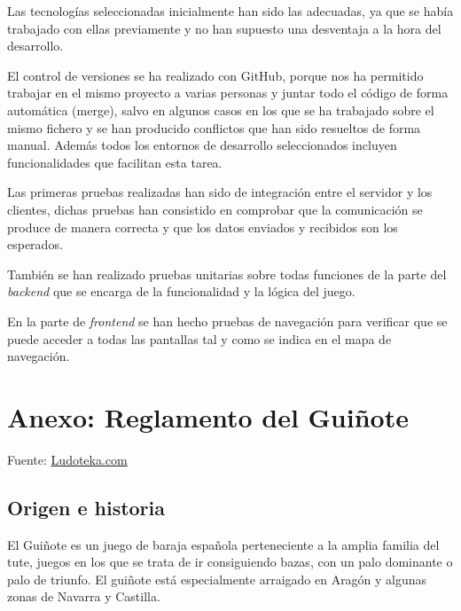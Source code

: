 \documentclass{article}
\begin{document}
Las tecnologías seleccionadas inicialmente han sido las adecuadas, ya que se había trabajado con ellas previamente y no han supuesto una desventaja a la hora del desarrollo.

El control de versiones se ha realizado con GitHub, porque nos ha permitido trabajar en el mismo proyecto a varias personas y juntar todo el código de forma automática (merge), salvo en algunos casos en los que se ha trabajado sobre el mismo fichero y se han producido conflictos que han sido resueltos de forma manual. Además todos los entornos de desarrollo seleccionados incluyen funcionalidades que facilitan esta tarea. 

Las primeras pruebas realizadas han sido de integración entre el servidor y los clientes, dichas pruebas han consistido en comprobar que la comunicación se produce de manera correcta y que los datos enviados y recibidos son los esperados.

También se han realizado pruebas unitarias sobre todas funciones de la parte del \textit{backend} que se encarga de la funcionalidad y la lógica del juego.

En la parte de \textit{frontend} se han hecho pruebas de navegación para verificar que se puede acceder a todas las pantallas tal y como se indica en el mapa de navegación.


\appendix
\section{Anexo: Reglamento del Guiñote}
Fuente: \href{https://www.ludoteka.com/clasika/guinote.html}{Ludoteka.com}

\subsection*{Origen e historia}
El Guiñote es un juego de baraja española perteneciente a la amplia familia del tute, juegos en los que se trata de ir consiguiendo bazas, con un palo dominante o palo de triunfo. El guiñote está especialmente arraigado en Aragón y algunas zonas de Navarra y Castilla.
\end{document}
